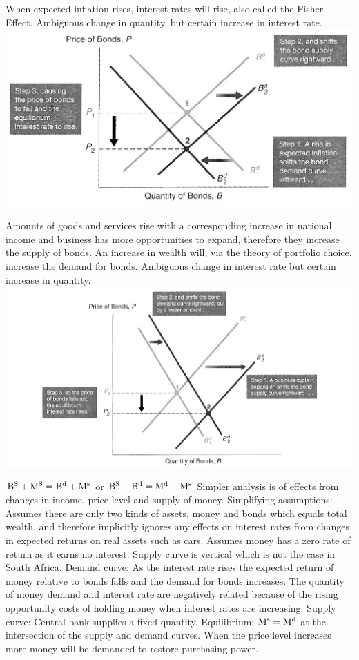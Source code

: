 \documentclass[12pt]{examnotes}
\begin{document}
\ra When expected inflation rises, interest rates will rise, also called the Fisher Effect. 
\ra Ambiguous change in quantity, but certain increase in interest rate.
\includegraphics[scale=0.4]{./imgs/54.jpg}

\ra Amounts of goods and services rise with a corresponding increase in national income and business has more opportunities to expand, therefore they increase the supply of bonds.
\ra An increase in wealth will, via the theory of portfolio choice, increase the demand for bonds. 
\ra Ambiguous change in interest rate but certain increase in quantity.
\includegraphics[scale=0.4]{./imgs/55.jpg}

$\rm{B^S+M^S=B^d+M^s}$ or $\rm{B^S-B^d=M^d-M^s}$
\ra Simpler analysis is of effects from changes in income, price level and supply of money.
\ra Simplifying assumptions: 
 Assumes there are only two kinds of assets, money and bonds which equals total wealth, and therefore implicitly ignores any effects on interest rates from changes in expected returns on real assets such as cars. 
 Assumes money has a zero rate of return as it earns no interest. Supply curve is vertical which is not the case in South Africa.
\ra Demand curve: As the interest rate rises the expected return of money relative to bonds falls and the demand for bonds increases. The quantity of money demand and interest rate are negatively related because of the rising opportunity costs of holding money when interest rates are increasing.
\ra Supply curve: Central bank supplies a fixed quantity.
\ra Equilibrium: $\rm{M^s=M^d}$ at the intersection of the supply and demand curves.
\ra When the price level increases more money will be demanded to restore purchasing power.
\end{document}
